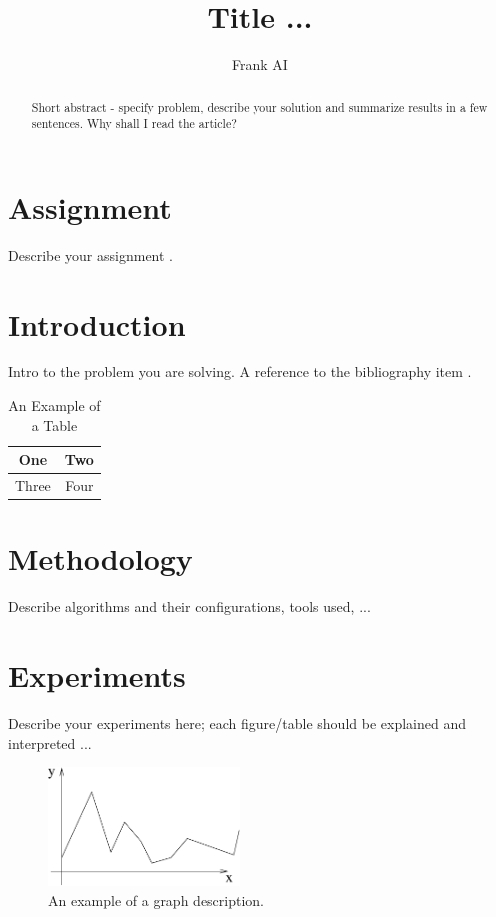 \documentclass[journal]{IEEEtran}
\begin{document}
%
\title{Title ...}
\author{Frank AI}

\maketitle


\begin{abstract}
Short abstract - specify problem, describe your solution and summarize results in a few sentences.
Why shall I read the article?
\end{abstract}

\section{Assignment}
Describe your assignment .

\section{Introduction}
%
Intro to the problem you are solving. A reference to the bibliography item \cite{IEEEhowto:kopka}.

\begin{table}[b]
\renewcommand{\arraystretch}{1.3}
\caption{An Example of a Table}
\label{table_example}
\centering
\begin{tabular}{|c||c|}
\hline
One & Two\\
\hline
Three & Four\\
\hline
\end{tabular}
\end{table}

\section{Methodology}
Describe algorithms and their configurations, tools used, ...

\section{Experiments}
Describe your experiments here; each figure/table should be explained and interpreted ...
\begin{figure}[!h]
\begin{center}
\includegraphics[width=2in]{figure.pdf}
\caption{An example of a graph description.}
\end{center}\label{fig:mypicture}
\end{figure}
\end{document}
